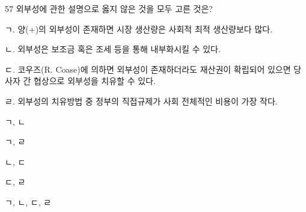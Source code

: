 \begin{question}{57}
외부성에 관한 설명으로 옳지 않은 것을 모두 고른 것은?
\begin{framedtext}
ㄱ. 양(+)의 외부성이 존재하면 시장 생산량은 사회적 최적 생산량보다 많다. \par
ㄴ. 외부성은 보조금 혹은 조세 등을 통해 내부화시킬 수 있다. \par
ㄷ. 코우즈(R. Coase)에 의하면 외부성이 존재하더라도 재산권이 확립되어 있으면 당사자 간 협상으로 외부성을 치유할 수 있다. \par
ㄹ. 외부성의 치유방법 중 정부의 직접규제가 사회 전체적인 비용이 가장 작다. \par
\end{framedtext}
\begin{choices}
  \item ㄱ, ㄴ
  \item ㄱ, ㄹ
  \item ㄴ, ㄷ
  \item ㄷ, ㄹ
  \item ㄱ, ㄴ, ㄷ, ㄹ
\end{choices}
\end{question}
